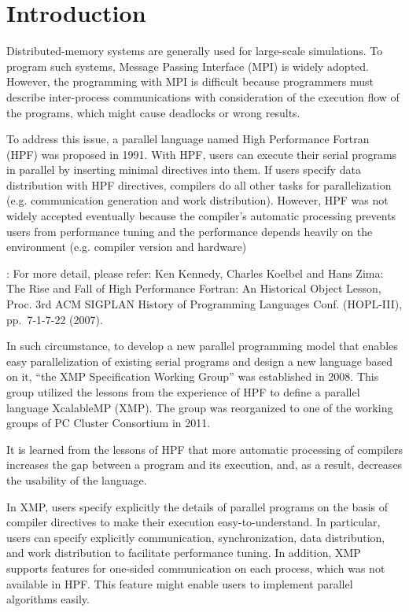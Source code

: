 \section{Introduction}

Distributed-memory systems are generally used for large-scale
simulations. To program such systems, Message Passing Interface (MPI) is
widely adopted. However, the programming with MPI is difficult because
programmers must describe inter-process communications with
consideration of the execution flow of the programs, which might cause
deadlocks or wrong results.

To address this issue, a parallel language named High Performance
Fortran (HPF) was proposed in 1991. With HPF, users can execute their
serial programs in parallel by inserting minimal directives into
them. If users specify data distribution with HPF directives, compilers
do all other tasks for parallelization (e.g. communication generation
and work distribution). However, HPF was not widely accepted eventually
because the compiler’s automatic processing prevents users from
performance tuning and the performance depends heavily on the
environment (e.g. compiler version and hardware)

\noindent\hrulefill

: For more detail, please refer: Ken Kennedy,
Charles Koelbel and Hans Zima: The Rise and Fall of High Performance
Fortran: An Historical Object Lesson, Proc. 3rd ACM SIGPLAN History of
Programming Languages Conf. (HOPL-III), pp.~7-1-7-22 (2007).

\noindent\hrulefill

In such circumstance, to develop a new parallel programming model that
enables easy parallelization of existing serial programs and design a
new language based on it, “the XMP Specification Working Group” was
established in 2008. This group utilized the lessons from the experience
of HPF to define a parallel language XcalableMP (XMP). The group was
reorganized to one of the working groups of PC Cluster Consortium in
2011.

It is learned from the lessons of HPF that more automatic processing of
compilers increases the gap between a program and its execution, and, as
a result, decreases the usability of the language.

In XMP, users specify explicitly the details of parallel programs on the
basis of compiler directives to make their execution
easy-to-understand. In particular, users can specify explicitly
communication, synchronization, data distribution, and work distribution
to facilitate performance tuning. In addition, XMP supports features for
one-sided communication on each process, which was not available in
HPF. This feature might enable users to implement parallel algorithms
easily.


